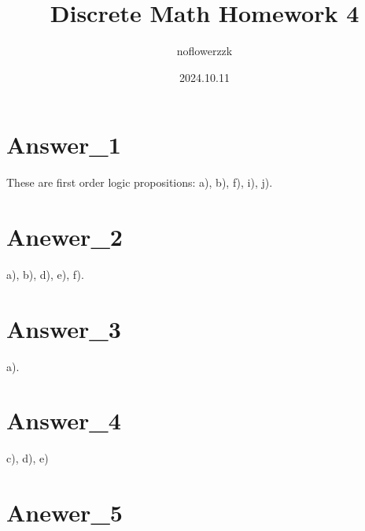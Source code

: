 \documentclass{article}
\title{Discrete Math Homework 4}
\author{noflowerzzk}
\date{2024.10.11}
\begin{document}
\maketitle

\section{Answer\_1}

These are first order logic propositions: a), b), f), i), j).

\section{Anewer\_2}

a), b), d), e), f).

\section{Answer\_3}

a).

\section{Answer\_4}

c), d), e)

\section{Anewer\_5}
\end{document}
